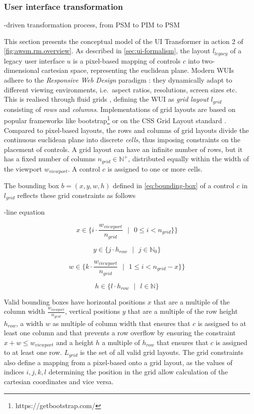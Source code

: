 \hypertarget{sec:uitransformation}{%
\subsubsection{User interface transformation}\label{sec:uitransformation}}

-driven transformation process, from PSM to PIM to PSM

This section presents the conceptual model of the UI Transformer in action 2 of \cref{fig:awsm.rm.overview}.
As described in \cref{sec:ui-formalism}, the layout \(l_{legacy}\) of a legacy user interface \(u\) is a pixel-based mapping of controls \(c\) into two-dimensional cartesian space, representing the euclidean plane.
Modern WUIs adhere to the \emph{Responsive Web Design} paradigm \autocite{Marcotte2010Responsive,Nebeling2013Responsive}: they dynamically adapt to different viewing environments, i.e.~aspect ratios, resolutions, screen sizes etc.
This is realised through fluid grids \autocite{Marcotte2010Responsive,Nebeling2013Responsive}, defining the WUI as \emph{grid layout} \(l_{grid}\) consisting of \emph{rows} and \emph{columns}.
Implementations of grid layouts are based on popular frameworks like bootstrap\footnote{https://getbootstrap.com/} or on the CSS Grid Layout standard \autocite{W3C2017CSSGrid}.
Compared to pixel-based layouts, the rows and columns of grid layouts divide the continuous euclidean plane into discrete \emph{cells}, thus imposing constraints on the placement of controls.
A grid layout can have an infinite number of rows, but it has a fixed number of columns \(n_{grid} \in \mathbb{N}^+\), distributed equally within the width of the viewport \(w_{viewport}\).
A control \(c\) is assigned to one or more cells.

The bounding box \(b = (x,y,w,h)\) defined in \cref{eq:bounding-box} of a control \(c\) in \(l_{grid}\) reflects these grid constraints as follows

-line equation

\[x \in \{i \cdot \frac{w_{viewport}}{n_{grid}} \text{ }|\text{ } 0 \leq i < n_{grid} \}\}\]

\[y \in \{j \cdot h_{row} \text{ }|\text{ } j \in \mathbb{N}_0 \}\]

\[w \in \{k \cdot \frac{w_{viewport}}{n_{grid}} \text{ }|\text{ } 1 \leq i < n_{grid} - x \}\}\]

\[h \in \{l \cdot h_{row} \text{ }|\text{ } l \in \mathbb{N} \}\]

Valid bounding boxes have horizontal positions \(x\) that are a multiple of the column width \(\frac{w_{viewport}}{n_{grid}}\), vertical positions \(y\) that are a multiple of the row height \(h_{row}\), a width \(w\) as multiple of column width that ensures that \(c\) is assigned to at least one column and that prevents a row overflow by ensuring the constraint \(x + w \leq w_{viewport}\) and a height \(h\) a multiple of \(h_{row}\) that ensures that \(c\) is assigned to at least one row.
\(L_{grid}\) is the set of all valid grid layouts.
The grid constraints also define a mapping from a pixel-based onto a grid layout, as the values of indices \(i,j,k,l\) determining the position in the grid allow calculation of the cartesian coordinates and vice versa.

